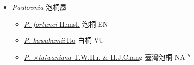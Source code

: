 
  \begin{itemize}
 \item[] \textit{Paulownia} 泡桐屬
                    
  \begin{itemize}
        \item[] \href{http://www.theplantlist.org/tpl1.1/search?q=Paulownia+fortunei}{\textit{P. fortunei} Hemsl.}   泡桐 EN
        \item[] \href{http://www.theplantlist.org/tpl1.1/search?q=Paulownia+kawakamii}{\textit{P. kawakamii} Ito}   白桐 VU
        \item[] \href{http://www.theplantlist.org/tpl1.1/search?q=Paulownia+×taiwaniana}{\textit{P. ×taiwaniana} T.W.Hu. \& H.J.Chang}   臺灣泡桐 NA $^h$
  \end{itemize}
  \end{itemize}
